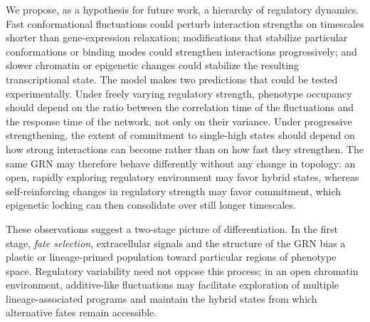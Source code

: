 \documentclass[11pt]{article}
\providecommand{\DIFaddtex}[1]{{\protect\color{red}#1}} %
\providecommand{\DIFdeltex}[1]{} %
\providecommand{\DIFaddbegin}{} %
\providecommand{\DIFaddend}{} %
\providecommand{\DIFdelbegin}{} %
\providecommand{\DIFdelend}{} %
\providecommand{\DIFadd}[1]{\texorpdfstring{\DIFaddtex{#1}}{#1}} %
\providecommand{\DIFdel}[1]{\texorpdfstring{\DIFdeltex{#1}}{}} %
\providecommand{\DIFaddincludegraphics}[2][]{\DIFOincludegraphics[#1]{#2}} %
\providecommand{\DIFdelincludegraphics}[2][]{}
\DeclareRobustCommand{\DIFaddbegin}{\DIFOaddbegin \let\includegraphics\DIFaddincludegraphics} %
\DeclareRobustCommand{\DIFaddend}{\DIFOaddend \let\includegraphics\DIFOincludegraphics} %
\DeclareRobustCommand{\DIFdelbegin}{\DIFOdelbegin \let\includegraphics\DIFdelincludegraphics} %
\DeclareRobustCommand{\DIFdelend}{\DIFOaddend \let\includegraphics\DIFOincludegraphics} %
\begin{document}
\DIFdelbegin \DIFdel{This suggests a }\DIFdelend \DIFaddbegin \DIFadd{We propose, as a hypothesis for future work, a }\DIFaddend hierarchy of regulatory dynamics. Fast \DIFdelbegin \DIFdel{IDP conformational fluctuations can continuously }\DIFdelend \DIFaddbegin \DIFadd{conformational fluctuations could }\DIFaddend perturb interaction strengths \DIFaddbegin \DIFadd{on timescales shorter than gene-expression relaxation; modifications that stabilize particular conformations or binding modes could strengthen interactions progressively}\DIFaddend ; \DIFdelbegin \DIFdel{intermediate-timescale modifications can bias the conformational ensemble and introduce regulatory memory; }\DIFdelend and slower chromatin or epigenetic changes \DIFdelbegin \DIFdel{can }\DIFdelend \DIFaddbegin \DIFadd{could }\DIFaddend stabilize the resulting transcriptional state. The \DIFaddbegin \DIFadd{model makes two predictions that could be tested experimentally. Under freely varying regulatory strength, phenotype occupancy should depend on the ratio between the correlation time of the fluctuations and the response time of the network, not only on their variance. Under progressive strengthening, the extent of commitment to single-high states should depend on how strong interactions can become rather than on how fast they strengthen. The }\DIFaddend same GRN may therefore behave differently without any change in topology\DIFdelbegin \DIFdel{depending on which timescale dominates. An }\DIFdelend \DIFaddbegin \DIFadd{: an }\DIFaddend open, rapidly exploring regulatory environment may favor \DIFdelbegin \DIFdel{additive-like dynamics and hybrid-state accessibility, whereas progressively correlated or }\DIFdelend \DIFaddbegin \DIFadd{hybrid states, whereas }\DIFaddend self-reinforcing \DIFdelbegin \DIFdel{regulatory changes may reduce that exploration and facilitate commitment. Epigenetic }\DIFdelend \DIFaddbegin \DIFadd{changes in regulatory strength may favor commitment, which epigenetic }\DIFaddend locking can then consolidate \DIFdelbegin \DIFdel{the selected attractor }\DIFdelend over still longer timescales.

These observations suggest a two-stage picture of differentiation. In the first stage, \emph{fate selection}, extracellular signals and the structure of the GRN bias a plastic or lineage-primed population toward particular regions of phenotype space. Regulatory variability need not oppose this process; in an open chromatin environment, additive-like fluctuations may facilitate exploration of multiple lineage-associated programs and maintain the hybrid states from which alternative fates remain accessible.
\end{document}
